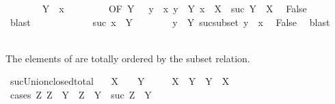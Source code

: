\begin{isabellebody}
\isanewline
\ \ \ \ \ \ \isamarkupfalse%
\ {\isachardoublequoteopen}Y\ {\isasymsubseteq}\ x{\isachardoublequoteclose}\isanewline
\ \ \ \ \ \ \isamarkupfalse%
\ {\isacharasterisk}{\kern0pt}\ {\isacharbrackleft}{\kern0pt}OF\ {\isacartoucheopen}Y\ {\isasymin}\ {\isasymC}{\isacartoucheclose}{\isacharbrackright}{\kern0pt}\ {\isacartoucheopen}y\ {\isasymin}\ x{\isacartoucheclose}\ {\isacartoucheopen}y\ {\isasymnotin}\ Y{\isacartoucheclose}\ {\isacartoucheopen}x\ {\isasymin}\ X{\isacartoucheclose}\ {\isacartoucheopen}{\isasymnot}\ suc\ Y\ {\isasymsubseteq}\ {\isasymUnion}X{\isacartoucheclose}\ \isamarkupfalse%
\ False\isanewline
\ \ \ \ \ \ \ \ \isamarkupfalse%
\ blast\isanewline
\ \ \ \ \isamarkupfalse%
\isanewline
\ \ \ \ \ \ \isamarkupfalse%
\ {\isachardoublequoteopen}suc\ x\ {\isasymsubseteq}\ Y{\isachardoublequoteclose}\isanewline
\ \ \ \ \ \ \isamarkupfalse%
\ {\isacartoucheopen}y\ {\isasymnotin}\ Y{\isacartoucheclose}\ suc{\isacharunderscore}{\kern0pt}subset\ {\isacartoucheopen}y\ {\isasymin}\ x{\isacartoucheclose}\ \isamarkupfalse%
\ False\ \isamarkupfalse%
\ blast\isanewline
\ \ \ \ \isamarkupfalse%
\isanewline
\ \ \isamarkupfalse%
\isanewline
{}\isamarkupfalse%
%
\endisatagproof
{\isafoldproof}%
%
\isadelimproof
%
\endisadelimproof
%
\begin{isamarkuptext}%
The elements of \isa{{\isasymC}} are totally ordered by the subset relation.%
\end{isamarkuptext}\isamarkuptrue%
\isamarkupfalse%
\ suc{\isacharunderscore}{\kern0pt}Union{\isacharunderscore}{\kern0pt}closed{\isacharunderscore}{\kern0pt}total{\isacharcolon}{\kern0pt}\isanewline
\ \ \ {\isachardoublequoteopen}X\ {\isasymin}\ {\isasymC}{\isachardoublequoteclose}\ \ {\isachardoublequoteopen}Y\ {\isasymin}\ {\isasymC}{\isachardoublequoteclose}\isanewline
\ \ \ {\isachardoublequoteopen}X\ {\isasymsubseteq}\ Y\ {\isasymor}\ Y\ {\isasymsubseteq}\ X{\isachardoublequoteclose}\isanewline
%
\isadelimproof
%
\endisadelimproof
%
\isatagproof
{}\isamarkupfalse%
\ {\isacharparenleft}{\kern0pt}cases\ {\isachardoublequoteopen}{\isasymforall}Z{\isasymin}{\isasymC}{\isachardot}{\kern0pt}\ Z\ {\isasymsubseteq}\ Y\ {\isasymlongrightarrow}\ Z\ {\isacharequal}{\kern0pt}\ Y\ {\isasymor}\ suc\ Z\ {\isasymsubseteq}\ Y{\isachardoublequoteclose}{\isacharparenright}{\kern0pt}\isanewline

\end{isabellebody}
